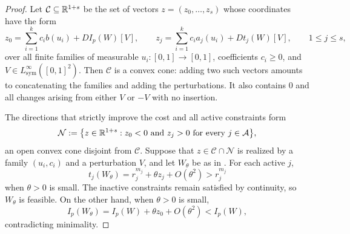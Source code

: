 \begin{proof}
Let $\mathcal C\subseteq\mathbb R^{1+s}$ be the set of vectors $z=(z_0,\dots,z_s)$
whose coordinates have the form
\[
  z_0=\sum_{i=1}^k c_i b(u_i)+DI_p(W)[V],
  \qquad z_j=\sum_{i=1}^k c_i a_j(u_i)+Dt_j(W)[V], \qquad 1\le j\le s,
\]
over all finite families of measurable $u_i:[0,1]\to[0,1]$, coefficients
$c_i\ge0$, and $V\in L^\infty_{\mathrm{sym}}([0,1]^2)$.  Then $\mathcal C$ is a convex cone: adding two such
vectors amounts to concatenating the families and adding the perturbations.
It also contains $0$ and all changes arising from either $V$ or $-V$ with no insertion.

The directions that strictly improve the cost and all active constraints form
\[
  \mathcal N:=\bigl\{z\in\mathbb R^{1+s}:z_0<0\text{ and }z_j>0\text{ for every }j\in\mathcal A\bigr\},
\]
an open convex cone disjoint from $\mathcal C$.  Suppose that
$z\in\mathcal C\cap\mathcal N$ is realized by a family $(u_i,c_i)$ and a
perturbation $V$, and let $W_\theta$ be as in
.  For each active $j$,
\[
  t_j(W_\theta)=r_j^{m_j}+\theta z_j+O(\theta^2)>r_j^{m_j}
\]
when $\theta>0$ is small.  The inactive constraints remain satisfied by
continuity, so $W_\theta$ is feasible.  On the other hand, when $\theta>0$ is small,
\[
  I_p(W_\theta)=I_p(W)+\theta z_0+O(\theta^2)<I_p(W),
\]
contradicting minimality.


\end{proof}
